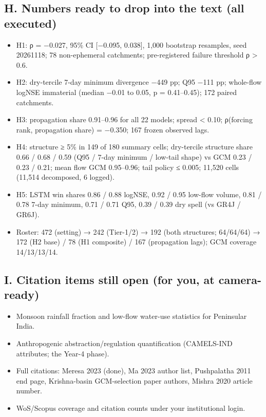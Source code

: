 \documentclass[
  11pt,
]{article}
\providecommand{\tightlist}{%
  \setlength{\itemsep}{0pt}\setlength{\parskip}{0pt}}
\begin{document}
\subsection{H. Numbers ready to drop into the text (all
executed)}\label{h.-numbers-ready-to-drop-into-the-text-all-executed}

\begin{itemize}
\tightlist
\item
  H1: ρ = −0.027, 95\% CI {[}−0.095, 0.038{]}, 1,000 bootstrap
  resamples, seed 20261118; 78 non-ephemeral catchments; pre-registered
  failure threshold ρ \textgreater{} 0.6.
\item
  H2: dry-tercile 7-day minimum divergence −449 pp; Q95 −111 pp;
  whole-flow logNSE immaterial (median −0.01 to 0.05, p = 0.41--0.45);
  172 paired catchments.
\item
  H3: propagation share 0.91--0.96 for all 22 models; spread \textless{}
  0.10; ρ(forcing rank, propagation share) = −0.350; 167 frozen observed
  lags.
\item
  H4: structure ≥ 5\% in 149 of 180 summary cells; dry-tercile structure
  share 0.66 / 0.68 / 0.59 (Q95 / 7-day minimum / low-tail shape) vs GCM
  0.23 / 0.23 / 0.21; mean flow GCM 0.95--0.96; tail policy ≤ 0.005;
  11,520 cells (11,514 decomposed, 6 logged).
\item
  H5: LSTM win shares 0.86 / 0.88 logNSE, 0.92 / 0.95 low-flow volume,
  0.81 / 0.78 7-day minimum, 0.71 / 0.71 Q95, 0.39 / 0.39 dry spell (vs
  GR4J / GR6J).
\item
  Roster: 472 (setting) → 242 (Tier-1/2) → 192 (both structures;
  64/64/64) → 172 (H2 base) / 78 (H1 composite) / 167 (propagation
  lags); GCM coverage 14/13/13/14.
\end{itemize}

\subsection{I. Citation items still open (for you, at
camera-ready)}\label{i.-citation-items-still-open-for-you-at-camera-ready}

\begin{itemize}
\tightlist
\item
  Monsoon rainfall fraction and low-flow water-use statistics for
  Peninsular India.
\item
  Anthropogenic abstraction/regulation quantification (CAMELS-IND
  attributes; the Year-4 phase).
\item
  Full citations: Meresa 2023 (done), Ma 2023 author list, Pushpalatha
  2011 end page, Krishna-basin GCM-selection paper authors, Mishra 2020
  article number.
\item
  WoS/Scopus coverage and citation counts under your institutional
  login.
\end{itemize}
\end{document}
